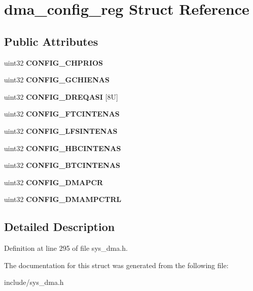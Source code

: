 \hypertarget{structdma__config__reg}{}\section{dma\+\_\+config\+\_\+reg Struct Reference}
\label{structdma__config__reg}
\subsection*{Public Attributes}
\begin{DoxyCompactItemize}
\item 
\mbox{\label{structdma__config__reg_a66623be50b2450873e2a5a9ca3d7e1e3}} 
uint32 {\bfseries C\+O\+N\+F\+I\+G\+\_\+\+C\+H\+P\+R\+I\+OS}
\item 
\mbox{\label{structdma__config__reg_af703bd19e20ec973e9868e27246511d9}} 
uint32 {\bfseries C\+O\+N\+F\+I\+G\+\_\+\+G\+C\+H\+I\+E\+N\+AS}
\item 
\mbox{\label{structdma__config__reg_acbc8b06365347ecb01160fd74e151c19}} 
uint32 {\bfseries C\+O\+N\+F\+I\+G\+\_\+\+D\+R\+E\+Q\+A\+SI} \mbox{[}8\+U\mbox{]}
\item 
\mbox{\label{structdma__config__reg_ad4d6d8bcaeee36c8ddb6728780a250ae}} 
uint32 {\bfseries C\+O\+N\+F\+I\+G\+\_\+\+F\+T\+C\+I\+N\+T\+E\+N\+AS}
\item 
\mbox{\label{structdma__config__reg_aa04ab0aa102a9e95dd907225499e711e}} 
uint32 {\bfseries C\+O\+N\+F\+I\+G\+\_\+\+L\+F\+S\+I\+N\+T\+E\+N\+AS}
\item 
\mbox{\label{structdma__config__reg_a8275a07d12a60e1685b3974ec5de7f34}} 
uint32 {\bfseries C\+O\+N\+F\+I\+G\+\_\+\+H\+B\+C\+I\+N\+T\+E\+N\+AS}
\item 
\mbox{\label{structdma__config__reg_a26e1f7dcd7525d35db10f8e48721c0d0}} 
uint32 {\bfseries C\+O\+N\+F\+I\+G\+\_\+\+B\+T\+C\+I\+N\+T\+E\+N\+AS}
\item 
\mbox{\label{structdma__config__reg_ade2b21227b2c3bd3c7375217912898b5}} 
uint32 {\bfseries C\+O\+N\+F\+I\+G\+\_\+\+D\+M\+A\+P\+CR}
\item 
\mbox{\label{structdma__config__reg_abfcfd361a3f5872ce48ea846a58a9ce0}} 
uint32 {\bfseries C\+O\+N\+F\+I\+G\+\_\+\+D\+M\+A\+M\+P\+C\+T\+RL}
\end{DoxyCompactItemize}


\subsection{Detailed Description}


Definition at line 295 of file sys\+\_\+dma.\+h.



The documentation for this struct was generated from the following file\+:\begin{DoxyCompactItemize}
\item 
include/sys\+\_\+dma.\+h\end{DoxyCompactItemize}
